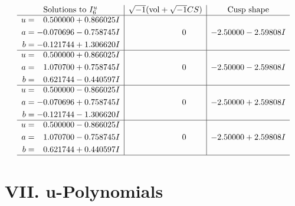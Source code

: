 \documentclass[1p]{elsarticle_modified}
\theoremstyle{definition}
\newcommand{\I}{\sqrt{-1}}
\begin{document}
$$\begin{array}{c|c|c}  
\text{Solutions to }I^u_{6}& \I (\text{vol} + \sqrt{-1}CS) & \text{Cusp shape}\\
 \hline 
\begin{aligned}
u &= \phantom{-}0.500000 + 0.866025 I \\
a &= -0.070696 - 0.758745 I \\
b &= -0.121744 + 1.306620 I\end{aligned}
 & \phantom{-0.000000 } 0 & -2.50000 - 2.59808 I \\ \hline\begin{aligned}
u &= \phantom{-}0.500000 + 0.866025 I \\
a &= \phantom{-}1.070700 + 0.758745 I \\
b &= \phantom{-}0.621744 - 0.440597 I\end{aligned}
 & \phantom{-0.000000 } 0 & -2.50000 - 2.59808 I \\ \hline\begin{aligned}
u &= \phantom{-}0.500000 - 0.866025 I \\
a &= -0.070696 + 0.758745 I \\
b &= -0.121744 - 1.306620 I\end{aligned}
 & \phantom{-0.000000 } 0 & -2.50000 + 2.59808 I \\ \hline\begin{aligned}
u &= \phantom{-}0.500000 - 0.866025 I \\
a &= \phantom{-}1.070700 - 0.758745 I \\
b &= \phantom{-}0.621744 + 0.440597 I\end{aligned}
 & \phantom{-0.000000 } 0 & -2.50000 + 2.59808 I\\
 \hline 
 \end{array}$$\newpage
\newpage\renewcommand{\arraystretch}{1}
\centering \section*{ VII. u-Polynomials}
\end{document}
